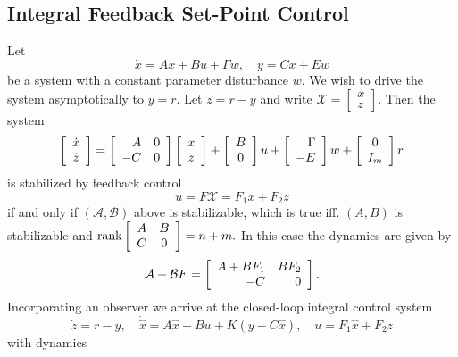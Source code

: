 \documentclass{report}
\begin{document}
\subsection{Integral Feedback Set-Point Control}
Let
$$
\dot{x} = Ax + Bu + \Gamma w, \quad
y = Cx + Ew
$$
be a system with a constant parameter disturbance $w$. We wish to
drive the system asymptotically to $y = r$. Let $\dot{z} = r - y$ and write
$
\mathcal{X} =
\left[\begin{array}{c}
  x \\ z
\end{array}\right].
$
Then the system
$$
\left[\begin{array}{c}
  \dot{x} \\
  \dot{z}
\end{array}\right]
=
\left[\begin{array}{r r}
  A & 0 \\
 -C & 0
\end{array}\right]
\left[\begin{array}{c}
  x \\
  z
\end{array}\right]
+
\left[\begin{array}{c}
  B \\
  0
\end{array}\right]
u
+
\left[\begin{array}{r}
   \Gamma \\
  -E
\end{array}\right]
w
+
\left[\begin{array}{c}
  0 \\
  I_m
\end{array}\right]
r
$$
is stabilized by feedback control
$$
u = F \mathcal{X} = F_1 x + F_2 z
$$
if and only if $(\mathcal{A}, \mathcal{B})$ above is stabilizable,
which is true iff. $(A, B)$ is stabilizable and
$
\mathrm{rank}
\left[\begin{array}{c c}
  A & B \\
  C & 0
\end{array}\right] = n + m.
$
In this case the dynamics are given by
$$
\mathcal{A} + \mathcal{B} F =
\left[\begin{array}{r r}
  A + BF_1 & BF_2 \\
  -C       & 0
\end{array}\right].
$$
Incorporating an observer we arrive at the closed-loop integral
control system
$$
\dot{z} = r - y, \quad
\dot{\hat{x}} = A \hat{x} + B u + K (y - C \hat{x}), \quad
u = F_1 \hat{x} + F_2 z
$$
with dynamics
\end{document}
